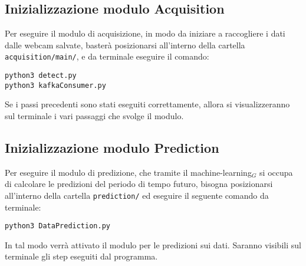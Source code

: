 \subsection{Inizializzazione modulo Acquisition}\label{RequisitiDiSistemaEdInstallazioneInstallazioneInizializzazioneModuloAcquisition}
Per eseguire il modulo di acquisizione, in modo da iniziare a raccogliere i dati dalle webcam salvate, basterà posizionarsi all'interno della cartella \texttt{acquisition/main/}, e da terminale eseguire il comando:
\begin{lstlisting}
python3 detect.py
python3 kafkaConsumer.py
\end{lstlisting}
Se i passi precedenti sono stati eseguiti correttamente, allora si visualizzeranno sul terminale i vari passaggi che svolge il modulo.


\subsection{Inizializzazione modulo Prediction}\label{RequisitiDiSistemaEdInstallazioneInstallazioneInizializzazioneModuloPrediction}
Per eseguire il modulo di predizione, che tramite il machine-learning$_G$ si occupa di calcolare le predizioni del periodo di tempo futuro, bisogna posizionarsi all'interno della cartella \texttt{prediction/} ed eseguire il seguente comando da terminale:

\begin{lstlisting}
python3 DataPrediction.py
\end{lstlisting}
In tal modo verrà attivato il modulo per le predizioni sui dati.
Saranno visibili sul terminale gli step eseguiti dal programma.

